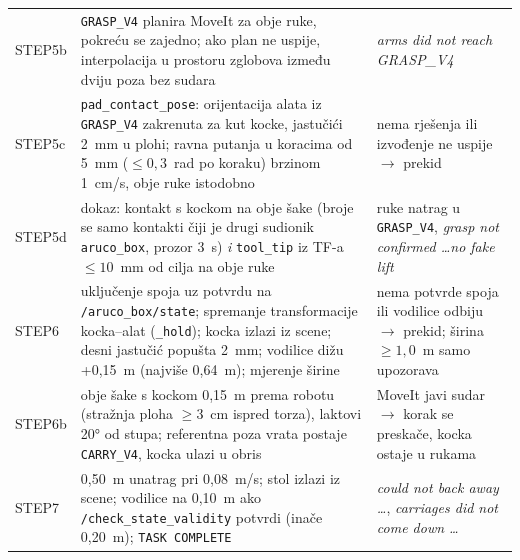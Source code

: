 \begin{small}
\begin{longtable}{@{}>{\raggedright\arraybackslash}p{}>{\raggedright\arraybackslash}p{}>{\raggedright\arraybackslash}p{}@{}}
\footnotesize STEP5b & \footnotesize \texttt{GRASP\_V4} planira MoveIt za obje ruke, pokreću se zajedno; ako plan ne uspije, interpolacija u prostoru zglobova između dviju poza bez sudara & \footnotesize \emph{arms did not reach GRASP\_V4} \\
\footnotesize STEP5c & \footnotesize \texttt{pad\_contact\_pose}: orijentacija alata iz \texttt{GRASP\_V4} zakrenuta za kut kocke, jastučići 2~mm u plohi; ravna putanja u koracima od 5~mm ($\leq0{,}3$~rad po koraku) brzinom 1~cm/s, obje ruke istodobno & \footnotesize nema rješenja ili izvođenje ne uspije $\rightarrow$ prekid \\
\footnotesize STEP5d & \footnotesize dokaz: kontakt s kockom na obje šake (broje se samo kontakti čiji je drugi sudionik \texttt{aruco\_box}, prozor 3~s) \emph{i} \texttt{tool\_tip} iz TF-a $\leq10$~mm od cilja na obje ruke & \footnotesize ruke natrag u \texttt{GRASP\_V4}, \emph{grasp not confirmed \ldots no fake lift} \\
\footnotesize STEP6 & \footnotesize uključenje spoja uz potvrdu na \texttt{/aruco\_box/state}; spremanje transformacije kocka--alat (\texttt{\_hold}); kocka izlazi iz scene; desni jastučić popušta 2~mm; vodilice dižu +0{,}15~m (najviše 0{,}64~m); mjerenje širine & \footnotesize nema potvrde spoja ili vodilice odbiju $\rightarrow$ prekid; širina $\geq1{,}0$~m samo upozorava \\
\footnotesize STEP6b & \footnotesize obje šake s kockom 0{,}15~m prema robotu (stražnja ploha $\geq3$~cm ispred torza), laktovi 20° od stupa; referentna poza vrata postaje \texttt{CARRY\_V4}, kocka ulazi u obris & \footnotesize MoveIt javi sudar $\rightarrow$ korak se preskače, kocka ostaje u rukama \\
\footnotesize STEP7 & \footnotesize 0{,}50~m unatrag pri 0{,}08~m/s; stol izlazi iz scene; vodilice na 0{,}10~m ako \texttt{/check\_state\_validity} potvrdi (inače 0{,}20~m); \texttt{TASK COMPLETE} & \footnotesize \emph{could not back away \ldots}, \emph{carriages did not come down \ldots} \\
\bottomrule
\end{longtable}
\end{small}

